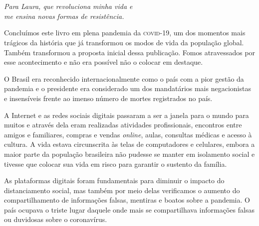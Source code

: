 \chapter*{}
\thispagestyle{empty}
\vfill{}
\begin{flushright}
\textit{Para Laura, que revoluciona minha vida e\\me ensina novas formas de resistência.}
\end{flushright}


\setlength{\epigraphwidth}{.60\textwidth}
\begin{epigraphs}
\end{epigraphs}

Concluímos este livro em plena pandemia da \textsc{covid-19}, um dos momentos
mais trágicos da história que já transformou os modos de vida da
população global. Também transformou a proposta inicial dessa
publicação. Fomos atravessados por esse acontecimento e não era possível
não o colocar em destaque.

O Brasil era reconhecido internacionalmente como o país com a pior
gestão da pandemia e o presidente era considerado um dos mandatários
mais negacionistas e insensíveis frente ao imenso número de mortes
registrados no país.

A Internet e as redes sociais digitais passaram a ser a janela para o
mundo para muitos e através dela eram realizadas atividades
profissionais, encontros entre amigos e familiares, compras e vendas
\textit{online}, aulas, consultas médicas e acesso à cultura. A vida
estava circunscrita às telas de computadores e celulares, embora
a maior parte da população brasileira não pudesse se manter em
isolamento social e tivesse que colocar sua vida em risco para garantir
o sustento da família.

As plataformas digitais foram fundamentais para diminuir o impacto do
distanciamento social, mas também por meio delas verificamos o aumento
do compartilhamento de informações falsas, mentiras e boatos sobre a
pandemia. O país ocupava o triste lugar daquele onde mais se compartilhava
informações falsas ou duvidosas sobre o coronavírus.

